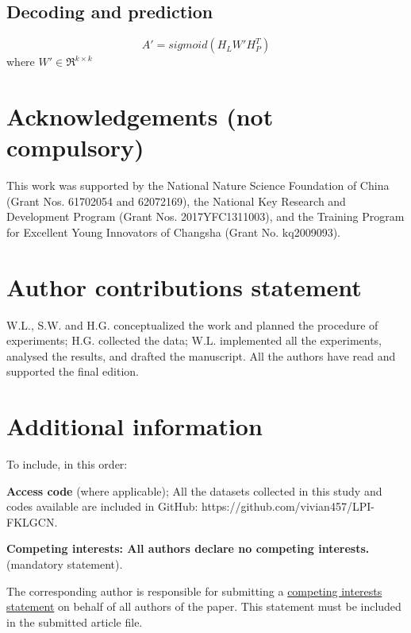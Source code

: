\documentclass[fleqn,10pt]{wlscirep}
\begin{document}
\subsection*{Decoding and prediction}

\begin{equation}
A' = sigmoid({H_L}W'H_P^T)
\end{equation}
where $W' \in {\Re ^{k \times k}}$




\section*{Acknowledgements (not compulsory)}
This work was supported by the National Nature Science Foundation of China (Grant Nos. 61702054 and 62072169), the National Key Research and Development Program (Grant Nos. 2017YFC1311003), and the Training Program for Excellent Young Innovators of Changsha (Grant No. kq2009093).

\section*{Author contributions statement}
W.L., S.W. and H.G. conceptualized the work and planned the procedure of experiments; H.G. collected the data; W.L. implemented all the experiments, analysed the results, and drafted the manuscript. All the authors have read and supported the final edition. 

\section*{Additional information}
To include, in this order: 

\textbf{Access code} (where applicable); 
All the datasets collected in this study and codes available are included in GitHub: https://github.com/vivian457/LPI-FKLGCN.

\textbf{Competing interests: All authors declare no competing interests.} (mandatory statement). 

The corresponding author is responsible for submitting a \href{http://www.nature.com/srep/policies/index.html#competing}{competing interests statement} on behalf of all authors of the paper. This statement must be included in the submitted article file.
\end{document}
